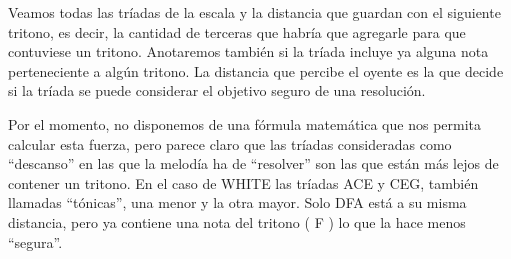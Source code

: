 \documentclass[]{article}
\begin{document}
Veamos todas las tríadas de la escala y la distancia que guardan con el siguiente tritono, es decir, la cantidad de terceras que habría que agregarle para que contuviese un tritono. Anotaremos también si la tríada incluye ya alguna nota perteneciente a algún tritono. La distancia que percibe el oyente es la que decide si la tríada se puede considerar el objetivo seguro de una resolución. 

Por el momento, no disponemos de una fórmula matemática que nos permita calcular esta fuerza, pero parece claro que las tríadas consideradas como ``descanso'' en las que la melodía ha de ``resolver'' son las que están más lejos de contener un tritono. En el caso de \textsf{WHITE} las tríadas \textsf{ACE} y \textsf{CEG}, también llamadas ``tónicas'', una menor y la otra mayor. Solo \textsf{DFA} está a su misma distancia, pero ya contiene una nota del tritono ( \textsf{F} ) lo que la hace menos ``segura''.
\end{document}
